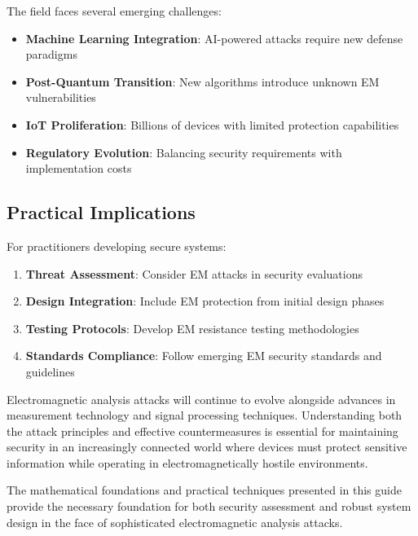 \documentclass[11pt,a4paper]{article}
\theoremstyle{definition}
\begin{document}
The field faces several emerging challenges:

\begin{itemize}
    \item \textbf{Machine Learning Integration}: AI-powered attacks require new defense paradigms
    \item \textbf{Post-Quantum Transition}: New algorithms introduce unknown EM vulnerabilities  
    \item \textbf{IoT Proliferation}: Billions of devices with limited protection capabilities
    \item \textbf{Regulatory Evolution}: Balancing security requirements with implementation costs
\end{itemize}

\subsection{Practical Implications}

For practitioners developing secure systems:

\begin{enumerate}
    \item \textbf{Threat Assessment}: Consider EM attacks in security evaluations
    \item \textbf{Design Integration}: Include EM protection from initial design phases
    \item \textbf{Testing Protocols}: Develop EM resistance testing methodologies
    \item \textbf{Standards Compliance}: Follow emerging EM security standards and guidelines
\end{enumerate}

Electromagnetic analysis attacks will continue to evolve alongside advances in measurement technology and signal processing techniques. Understanding both the attack principles and effective countermeasures is essential for maintaining security in an increasingly connected world where devices must protect sensitive information while operating in electromagnetically hostile environments.

The mathematical foundations and practical techniques presented in this guide provide the necessary foundation for both security assessment and robust system design in the face of sophisticated electromagnetic analysis attacks.

\newpage
\end{document}
